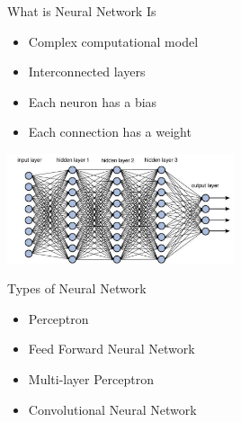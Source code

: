 \documentclass{beamer}
\begin{document}
\begin{frame}{What is Neural Network Is}
\begin{multicols}{2}
    \begin{itemize}
        \item Complex computational model
        \item Interconnected layers
        \item Each neuron has a bias
        \item Each connection has a weight
    \end{itemize}
    \begin{center}
        \includegraphics[width=0.5\textwidth]{images/neural_network}
    \end{center}
\end{multicols}
\end{frame}

\begin{frame}{Types of Neural Network}
    \begin{itemize}
        \item Perceptron
        \item Feed Forward Neural Network
        \item Multi-layer Perceptron
        \item Convolutional Neural Network
    \end{itemize}
\end{frame}
\end{document}
